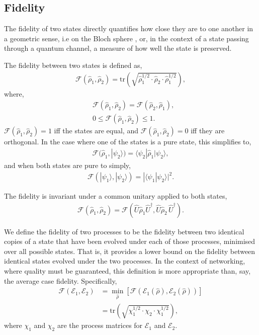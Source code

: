 \documentclass[aps,rmp,twocolumn,amsmath,amssymb,nofootinbib,superscriptaddress,longbibliography,floatfix]{revtex4-1}
\newcommand{\bra}[1]{\langle#1|}
\newcommand{\ket}[1]{|#1\rangle}
\newcommand{\comment}[1]{{\color{blue}{\textbf{#1}}}}
\begin{document}
%
%

\subsection{Fidelity} \label{sec:fid_metric}

The fidelity of two states directly quantifies how close they are to one another in a geometric sense, i.e on the Bloch sphere \cite{???}, or, in the context of a state passing through a quantum channel, a measure of how well the state is preserved.

The fidelity between two states is defined as,
\begin{align}
\mathcal{F}(\hat\rho_1,\hat\rho_2) = \mathrm{tr}\left(\sqrt{\hat\rho_1^{1/2}\cdot\hat\rho_2\cdot\hat\rho_1^{1/2}}\right),
\end{align}
where,
\begin{align}
& \mathcal{F}(\hat\rho_1,\hat\rho_2) = \mathcal{F}(\hat\rho_2,\hat\rho_1), \nonumber \\
& 0\leq \mathcal{F}(\hat\rho_1,\hat\rho_2) \leq 1.
\end{align}
\mbox{$\mathcal{F}(\hat\rho_1,\hat\rho_2)=1$} iff the states are equal, and \mbox{$\mathcal{F}(\hat\rho_1,\hat\rho_2)=0$} iff they are orthogonal.
In the case where one of the states is a pure state, this simplifies to,
\begin{align}
\mathcal{F}(\hat\rho_1,\ket{\psi_2}) = \bra{\psi_2}\hat\rho_1\ket{\psi_2},
\end{align}
and when both states are pure to simply,
\begin{align}
\mathcal{F}(\ket{\psi_1},\ket{\psi_2}) = |\langle\psi_1 | \psi_2\rangle|^2.
\end{align}

The fidelity is invariant under a common unitary applied to both states,
\begin{align}
\mathcal{F}(\hat\rho_1,\hat\rho_2) = \mathcal{F}(\hat{U}\hat\rho_1 \hat{U}^\dag,\hat{U} \hat\rho_2\,\hat{U}^\dag).
\end{align}

We define the fidelity of two processes \cite{bib:Gilchrist05} to be the fidelity between two identical copies of a state that have been evolved under each of those processes, minimised over all possible states. That is, it provides a lower bound on the fidelity between identical states evolved under the two processes. In the context of networking, where quality must be guaranteed, this definition is more appropriate than, say, the average case fidelity. Specifically,
\begin{align}
\mathcal{F}(\mathcal{E}_1,\mathcal{E}_2) &= \min_{\hat\rho} \left[\mathcal{F}(\mathcal{E}_1(\hat\rho),\mathcal{E}_2(\hat\rho))\right] \nonumber \\
&= \mathrm{tr}\left(\sqrt{\chi_1^{1/2}\cdot\chi_2\cdot\chi_1^{1/2}}\right),
\end{align}
\comment{CHECK THIS!} where $\chi_1$ and $\chi_2$ are the process matrices for $\mathcal{E}_1$ and $\mathcal{E}_2$.
\end{document}
